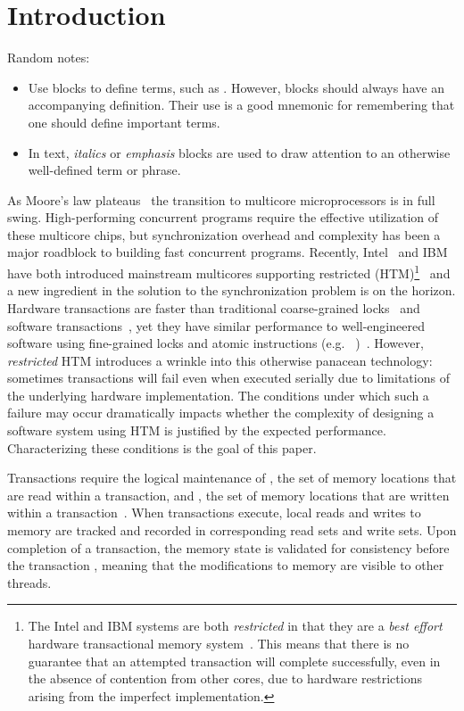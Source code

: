 \section{Introduction}
Random notes:
\begin{itemize}
\item Use  blocks to define terms, such as 
.  However,  
blocks should always have an accompanying definition.  Their
use is a good mnemonic for remembering that one should define
important terms.
\item In text, \textit{italics} or \emph{emphasis} blocks
are used to draw attention to an otherwise well-defined term
or phrase.  
\end{itemize}


As Moore's law plateaus~\cite{???} the transition
to multicore microprocessors is in full swing. High-performing concurrent
programs require the effective utilization of these multicore chips, but 
synchronization overhead and complexity has been a
major roadblock to building fast concurrent programs.
Recently, Intel~\cite{???} and IBM~\cite{???} 
have both introduced mainstream 
multicores supporting restricted  (HTM)\footnote{The Intel and IBM
systems are both \emph{restricted} in that they are 
a \emph{best effort} hardware transactional
memory system~\cite{???}.  This means that there is no 
guarantee that an attempted
transaction will complete successfully, even in the absence 
of contention from other cores, due to hardware restrictions
arising from the imperfect implementation.}~\cite{???}
and a new ingredient in the solution 
to the synchronization problem is
on the horizon. Hardware transactions are faster than traditional
coarse-grained locks~\cite{???} and software transactions~\cite{???}, 
yet they have similar performance to well-engineered software
using fine-grained locks and atomic instructions (e.g.
~\cite{???})~\cite{???}. 
However, \emph{restricted} HTM introduces a wrinkle into 
this otherwise panacean technology: sometimes transactions
will fail even when executed serially due to limitations
of the underlying hardware implementation.  The conditions
under which such a failure may occur dramatically impacts
whether the complexity of designing a software system using HTM
is justified by the expected performance.  Characterizing
these conditions is the goal of this paper. 

Transactions require the logical 
maintenance of , the set
of memory locations that are read within a 
transaction, and , the set
of memory locations that are written within 
a transaction~\cite{???}. When transactions execute, 
local reads and writes to memory 
are tracked and recorded in
corresponding read sets and write sets. Upon 
completion of a transaction, the memory state is validated for 
consistency before the transaction
, meaning that the modifications to 
memory are visible to other threads.

